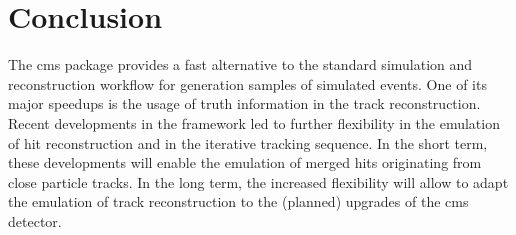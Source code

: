 
\section{Conclusion}
\label{sec:fsim-conclusion}

The \gls{cms} \FSIM package provides a fast alternative to the standard simulation and reconstruction workflow for generation samples of simulated events. One of its major speedups is the usage of truth information in the track reconstruction. Recent developments in the framework led to further flexibility in the emulation of hit reconstruction and in the iterative tracking sequence. In the short term, these developments will enable the emulation of merged hits originating from close particle tracks. In the long term, the increased flexibility will allow to adapt the emulation of track reconstruction to the (planned) upgrades of the \gls{cms} detector.



